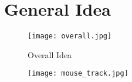 \section{General Idea}

\begin{figure}
\centering
\texttt{[image: overall.jpg]}
\caption{Overall Idea}
\label{fig:overallIdea}
\centering
\end{figure}


\begin{figure}
\centering
\texttt{[image: mouse\_track.jpg]}
\caption{}
\label{fig:overallIdea}
\centering
\end{figure}

